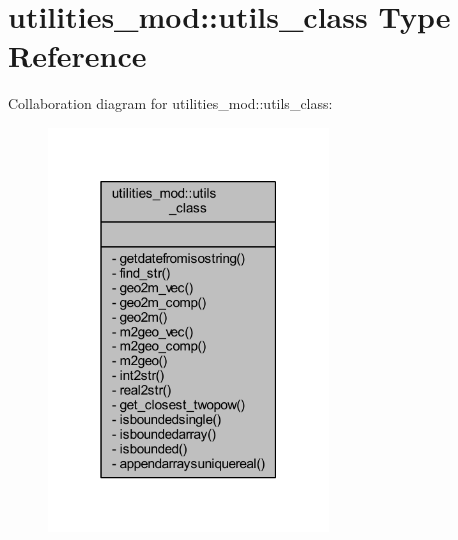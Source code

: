 \hypertarget{structutilities__mod_1_1utils__class}{}\section{utilities\+\_\+mod\+:\+:utils\+\_\+class Type Reference}
\label{structutilities__mod_1_1utils__class}


Collaboration diagram for utilities\+\_\+mod\+:\+:utils\+\_\+class\+:\nopagebreak
\begin{figure}[H]
\begin{center}
\leavevmode
\includegraphics[width=211pt]{structutilities__mod_1_1utils__class__coll__graph}
\end{center}
\end{figure}
